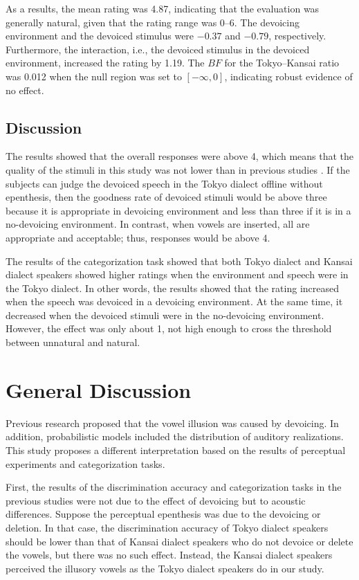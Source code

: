 \documentclass[a4paper,11pt,twocolumn]{article}
\begin{document}
As a results, the mean rating was 4.87, indicating that the evaluation was generally natural, given that the rating range was 0--6. The devoicing environment and the devoiced stimulus were $-0.37$ and $-0.79$, respectively. Furthermore, the interaction, i.e., the devoiced stimulus in the devoiced environment, increased the rating by 1.19. The $BF$ for the Tokyo--Kansai ratio was 0.012 when the null region was set to $[-\infty, 0]$, indicating robust evidence of no effect.

\subsection{Discussion}

The results showed that the overall responses were above 4, which means that the quality of the stimuli in this study was not lower than in previous studies \cite{kilpatrick2018japanese}. If the subjects can judge the devoiced speech in the Tokyo dialect offline without epenthesis, then the goodness rate of devoiced stimuli would be above three because it is appropriate in devoicing environment and less than three if it is in a no-devoicing environment. In contrast, when vowels are inserted, all are appropriate and acceptable; thus, responses would be above 4.

The results of the categorization task showed that both Tokyo dialect and Kansai dialect speakers showed higher ratings when the environment and speech were in the Tokyo dialect. In other words, the results showed that the rating increased when the speech was devoiced in a devoicing environment. At the same time, it decreased when the devoiced stimuli were in the no-devoicing environment. However, the effect was only about 1, not high enough to cross the threshold between unnatural and natural.

\section{General Discussion}

Previous research proposed that the vowel illusion was caused by devoicing. In addition, probabilistic models included the distribution of auditory realizations. This study proposes a different interpretation based on the results of perceptual experiments and categorization tasks.

First, the results of the discrimination accuracy and categorization tasks in the previous studies were not due to the effect of devoicing but to acoustic differences. Suppose the perceptual epenthesis was due to the devoicing or deletion. In that case, the discrimination accuracy of Tokyo dialect speakers should be lower than that of Kansai dialect speakers who do not devoice or delete the vowels, but there was no such effect. Instead, the Kansai dialect speakers perceived the illusory vowels as the Tokyo dialect speakers do in our study.
\end{document}

